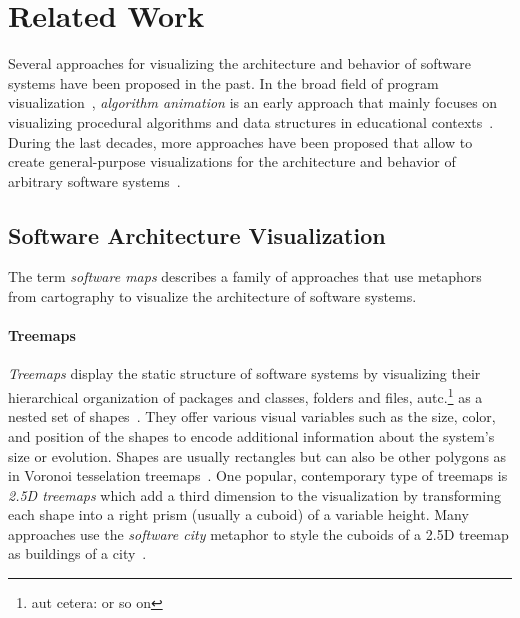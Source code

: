 \section{Related Work}
\label{sec:related_work}

Several approaches for visualizing the architecture and behavior of software systems have been proposed in the past.
In the broad field of program visualization~\cite{myers1986visual,teyseyre2009overview,sorva2013review,merino2018towards}, \emph{algorithm animation} is an early approach that mainly focuses on visualizing procedural algorithms and data structures in educational contexts~\cite{brown1984system}.
During the last decades, more approaches have been proposed that allow to create general-purpose visualizations for the architecture and behavior of arbitrary software systems~\cite{reiss2006visualizing,cheng2008xdiva,chis2014moldable,devkota2022domain}.

\subsection{Software Architecture Visualization}

The term \emph{software maps} describes a family of approaches that use metaphors from cartography to visualize the architecture of software systems.

\paragraph{Treemaps}

\emph{Treemaps} display the static structure of software systems by visualizing their hierarchical organization of packages and classes, folders and files, autc.\footnote{aut cetera: or so on} as a nested set of shapes~\cite{limberger2019advanced,limberger2022visual}.
They offer various visual variables such as the size, color, and position of the shapes to encode additional information about the system's size or evolution.
Shapes are usually rectangles but can also be other polygons as in Voronoi tesselation treemaps~\cite{balzer2005voronoi}.
One popular, contemporary type of treemaps is \emph{2.5D treemaps} which add a third dimension to the visualization by transforming each shape into a right prism (usually a cuboid) of a variable height.
Many approaches use the \emph{software city} metaphor to style the cuboids of a 2.5D treemap as buildings of a city~\cite{dugerdil2008execution,wettel2007visualizing,sasso2015blended,ardigo2021visualizing,mortara2021visualization,hoff2022utilizing,limberger2022visual}.

